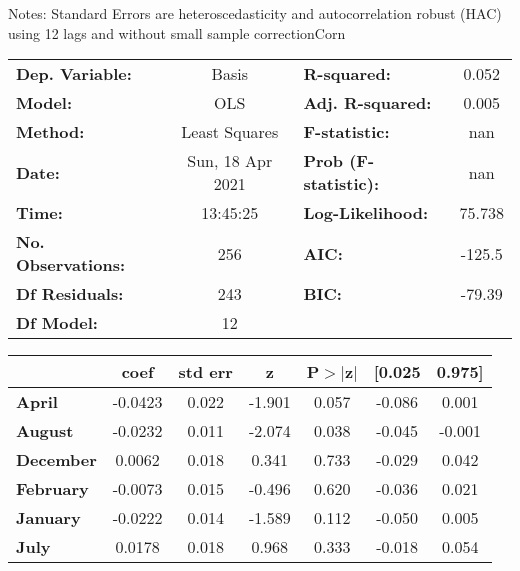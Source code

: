 Notes: \newline
 [1] Standard Errors are heteroscedasticity and autocorrelation robust (HAC) using 12 lags and without small sample correctionCorn\begin{center}
\begin{tabular}{lclc}
\toprule
\textbf{Dep. Variable:}    &      Basis       & \textbf{  R-squared:         } &     0.052   \\
\textbf{Model:}            &       OLS        & \textbf{  Adj. R-squared:    } &     0.005   \\
\textbf{Method:}           &  Least Squares   & \textbf{  F-statistic:       } &       nan   \\
\textbf{Date:}             & Sun, 18 Apr 2021 & \textbf{  Prob (F-statistic):} &      nan    \\
\textbf{Time:}             &     13:45:25     & \textbf{  Log-Likelihood:    } &    75.738   \\
\textbf{No. Observations:} &         256      & \textbf{  AIC:               } &    -125.5   \\
\textbf{Df Residuals:}     &         243      & \textbf{  BIC:               } &    -79.39   \\
\textbf{Df Model:}         &          12      & \textbf{                     } &             \\
\bottomrule
\end{tabular}
\begin{tabular}{lcccccc}
                   & \textbf{coef} & \textbf{std err} & \textbf{z} & \textbf{P$> |$z$|$} & \textbf{[0.025} & \textbf{0.975]}  \\
\midrule
\textbf{April}     &      -0.0423  &        0.022     &    -1.901  &         0.057        &       -0.086    &        0.001     \\
\textbf{August}    &      -0.0232  &        0.011     &    -2.074  &         0.038        &       -0.045    &       -0.001     \\
\textbf{December}  &       0.0062  &        0.018     &     0.341  &         0.733        &       -0.029    &        0.042     \\
\textbf{February}  &      -0.0073  &        0.015     &    -0.496  &         0.620        &       -0.036    &        0.021     \\
\textbf{January}   &      -0.0222  &        0.014     &    -1.589  &         0.112        &       -0.050    &        0.005     \\
\textbf{July}      &       0.0178  &        0.018     &     0.968  &         0.333        &       -0.018    &        0.054     \\

\end{tabular}
\end{center}
